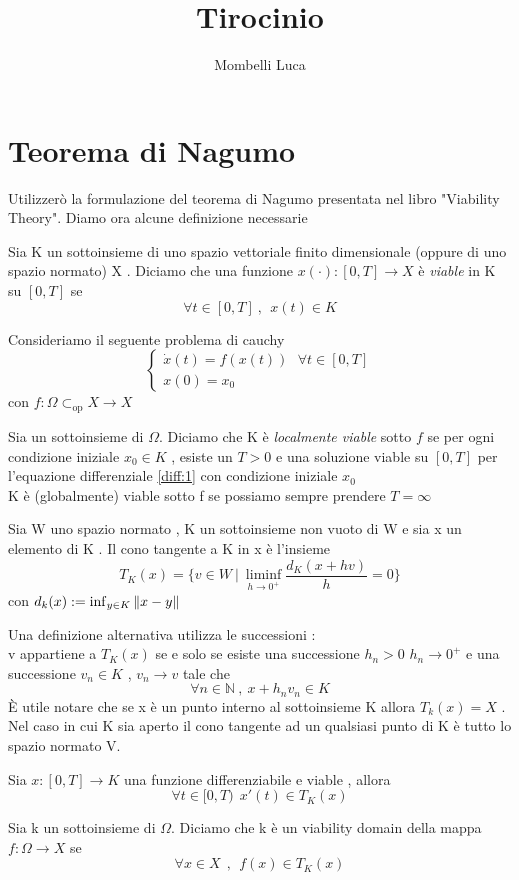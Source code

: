 \documentclass{article}
\title{Tirocinio}
\author{Mombelli Luca}
\begin{document}
	\maketitle
	\tableofcontents
	\newpage
	\section{Teorema di Nagumo}
	Utilizzerò la formulazione del teorema di Nagumo presentata nel libro "Viability Theory"\cite{VT}. Diamo ora alcune definizione necessarie 
	\begin{definizione}
		Sia K un sottoinsieme di uno spazio vettoriale finito dimensionale (oppure di uno spazio normato) X . Diciamo che una funzione $x (\cdot) : [0,T] \rightarrow X$ è \textit{viable} in K su $[0,T]$ se 
		$$\forall t \in [0,T] \ , \ \ x(t) \in K$$ 
	\end{definizione}
Consideriamo il seguente problema di cauchy 
\begin{equation}
	\label{diff:1}
\begin{cases}
	\dot{x}(t)= f(x(t)) \ \ \ \forall t \in [0,T ] \\ 
	x(0) = x_0
\end{cases}
\end{equation}
 con $f : \Omega \subset_{\text{op}} X \rightarrow X$ 
	\begin{definizione}
		Sia un sottoinsieme di $\Omega$. 
		Diciamo che K è\textit{ localmente viable} sotto $f$ se per ogni condizione iniziale $x_0 \in K $ , esiste un $T > 0$ e una soluzione viable su $[0,T]$  per l'equazione differenziale \ref{diff:1} con condizione iniziale $x_0$\\
		K è (globalmente) viable sotto f se possiamo sempre prendere $T= \infty$ 
	\end{definizione}
\begin{definizione}
Sia W uno spazio normato , K un sottoinsieme non vuoto di W e sia x un elemento di K . Il cono tangente a K in x è l'insieme
$$T_K(x)= \{v \in W \ | \ \liminf_{h\rightarrow 0^+ }\frac{d_K(x+hv)}{h}=0\}$$
con $d_k(x):= \inf_{y \in K } \norm{x-y}$
\end{definizione}
Una definizione alternativa utilizza le successioni : \\
v appartiene a $T_K(x)$ se e solo se esiste una successione $h_n >0$ $h_n \rightarrow 0^+$ e una successione $v_n \in K$ , $v_n \rightarrow v $ tale che 
$$\forall n \in \mathbb{N} \ , \ x+h_nv_n \in K $$
È utile notare che se x è un punto interno al sottoinsieme K allora $T_k(x)=X$ . Nel caso in cui K sia aperto il cono tangente ad un qualsiasi punto di K è tutto lo spazio normato V.\\
\begin{lemma}
Sia $x: [0,T] \rightarrow K $ una funzione differenziabile e viable , allora 
$$\forall t \in [0,T) \ \ x'(t) \in T_K(x)$$
\end{lemma}
	\begin{definizione}
		Sia  k un sottoinsieme di  $\Omega$. Diciamo che k è  un viability domain della mappa $f : \Omega \rightarrow X$ se 
		$$\forall x \in X  \ \ , \ \ f(x) \in T_K(x)$$
	\end{definizione}
	
\end{document}
